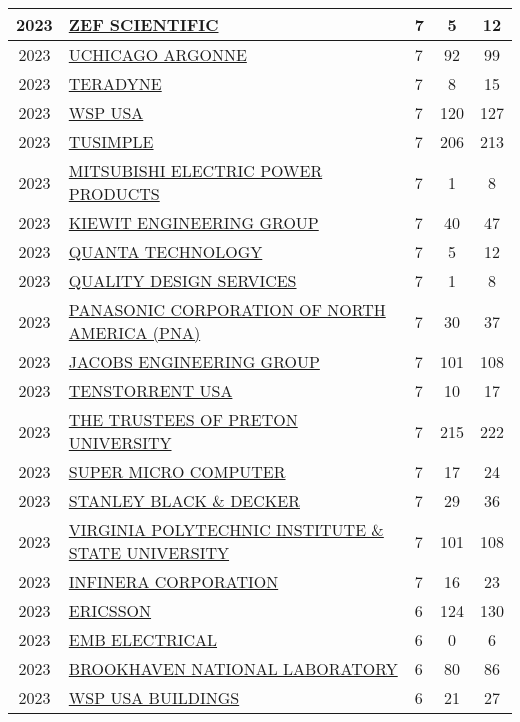 \documentclass{article}%
\begin{document}
\begin{longtable}{c|p{20em}|p{5em}|c|c}
\hline%
2023&\hyperref[subsec:ZEFSCIENTIFIC]{ZEF SCIENTIFIC}&7&5&12\\%
\hline%
2023&\hyperref[subsec:UCHICAGOARGONNE]{UCHICAGO ARGONNE}&7&92&99\\%
\hline%
2023&\hyperref[subsec:TERADYNE]{TERADYNE}&7&8&15\\%
\hline%
2023&\hyperref[subsec:WSPUSA]{WSP USA}&7&120&127\\%
\hline%
2023&\hyperref[subsec:TUSIMPLE]{TUSIMPLE}&7&206&213\\%
\hline%
2023&\hyperref[subsec:MITSUBISHIELECTRICPOWERPRODUCTS]{MITSUBISHI ELECTRIC POWER PRODUCTS}&7&1&8\\%
\hline%
2023&\hyperref[subsec:KIEWITENGINEERINGGROUP]{KIEWIT ENGINEERING GROUP}&7&40&47\\%
\hline%
2023&\hyperref[subsec:QUANTATECHNOLOGY]{QUANTA TECHNOLOGY}&7&5&12\\%
\hline%
2023&\hyperref[subsec:QUALITYDESIGNSERVICES]{QUALITY DESIGN SERVICES}&7&1&8\\%
\hline%
2023&\hyperref[subsec:PANASONICCORPORATIONOFNORTHAMERICA(PNA)]{PANASONIC CORPORATION OF NORTH AMERICA (PNA)}&7&30&37\\%
\hline%
2023&\hyperref[subsec:JACOBSENGINEERINGGROUP]{JACOBS ENGINEERING GROUP}&7&101&108\\%
\hline%
2023&\hyperref[subsec:TENSTORRENTUSA]{TENSTORRENT USA}&7&10&17\\%
\hline%
2023&\hyperref[subsec:THETRUSTEESOFPRETONUNIVERSITY]{THE TRUSTEES OF PRETON UNIVERSITY}&7&215&222\\%
\hline%
2023&\hyperref[subsec:SUPERMICROCOMPUTER]{SUPER MICRO COMPUTER}&7&17&24\\%
\hline%
2023&\hyperref[subsec:STANLEYBLACKDECKER]{STANLEY BLACK \& DECKER}&7&29&36\\%
\hline%
2023&\hyperref[subsec:VIRGINIAPOLYTECHNICINSTITUTESTATEUNIVERSITY]{VIRGINIA POLYTECHNIC INSTITUTE \& STATE UNIVERSITY}&7&101&108\\%
\hline%
2023&\hyperref[subsec:INFINERACORPORATION]{INFINERA CORPORATION}&7&16&23\\%
\hline%
2023&\hyperref[subsec:ERICSSON]{ERICSSON}&6&124&130\\%
\hline%
2023&\hyperref[subsec:EMBELECTRICAL]{EMB ELECTRICAL}&6&0&6\\%
\hline%
2023&\hyperref[subsec:BROOKHAVENNATIONALLABORATORY]{BROOKHAVEN NATIONAL LABORATORY}&6&80&86\\%
\hline%
2023&\hyperref[subsec:WSPUSABUILDINGS]{WSP USA BUILDINGS}&6&21&27\\%

\end{longtable}
\end{document}
